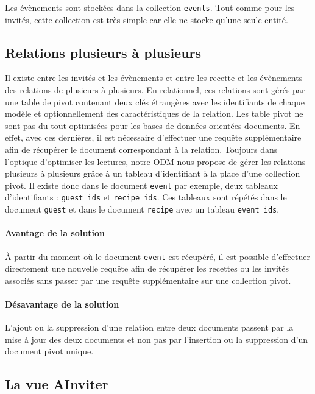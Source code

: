 		Les évènements sont stockées dans la collection \verb|events|. Tout comme pour les invités, cette collection est très simple car elle ne stocke qu'une seule entité.

	\subsection{Relations plusieurs à plusieurs}

		Il existe entre les invités et les évènements et entre les recette et les évènements des relations de plusieurs à plusieurs. En relationnel, ces relations sont gérés par une table de pivot contenant deux clés étrangères avec les identifiants de chaque modèle et optionnellement des caractéristiques de la relation. Les table pivot ne sont pas du tout optimisées pour les bases de données orientées documents. En effet, avec ces dernières, il est nécessaire d'effectuer une requête supplémentaire afin de récupérer le document correspondant à la relation. Toujours dans l'optique d'optimiser les lectures, notre ODM nous propose de gérer les relations plusieurs à plusieurs grâce à un tableau d'identifiant à la place d'une collection pivot. Il existe donc dans le document \verb|event| par exemple, deux tableaux d'identifiants : \verb|guest_ids| et \verb|recipe_ids|. Ces tableaux sont répétés dans le document \verb|guest| et dans le document \verb|recipe| avec un tableau \verb|event_ids|.

		\paragraph{Avantage de la solution}%
			À partir du moment où le document \verb|event| est récupéré, il est possible d'effectuer directement une nouvelle requête afin de récupérer les recettes ou les invités associés sans passer par une requête supplémentaire sur une collection pivot.

		\paragraph{Désavantage de la solution}%
			L'ajout ou la suppression d'une relation entre deux documents passent par la mise à jour des deux documents et non pas par l'insertion ou la suppression d'un document pivot unique.

	\subsection{La vue AInviter}

